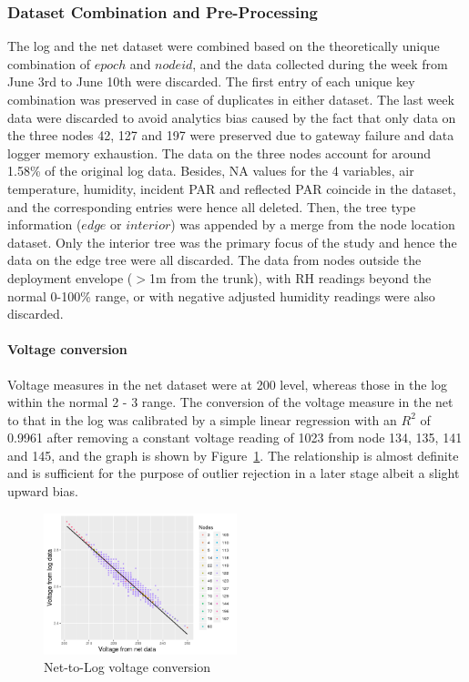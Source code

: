 \documentclass[11pt]{article}
\begin{document}
\subsubsection{Dataset Combination and Pre-Processing}
\label{subsubsec:preprocess}
The log and the net dataset were combined based on the theoretically unique combination of $epoch$ and $nodeid$, and the data collected during the week from June 3rd to June 10th were discarded. The first entry of each unique key combination was preserved in case of duplicates in either dataset. The last week data were discarded to avoid analytics bias caused by the fact that only data on the three nodes 42, 127 and 197 were preserved due to gateway failure and data logger memory exhaustion. The data on the three nodes account for around 1.58\% of the original log data. Besides, NA values for the 4 variables, air temperature, humidity, incident PAR and reflected PAR coincide in the dataset, and the corresponding entries were hence all deleted. Then, the tree type information ($edge$ or $interior$) was appended by a merge from the node location dataset. Only the interior tree was the primary focus of the study and hence the data on the edge tree were all discarded. The data from nodes outside the deployment envelope ($>$1m from the trunk), with RH readings beyond the normal 0-100\% range, or with negative adjusted humidity readings were also discarded.


\paragraph{Voltage conversion}
Voltage measures in the net dataset were at 200 level, whereas those in the log within the normal 2 - 3 range. The conversion of the voltage measure in the net to that in the log was calibrated by a simple linear regression with an $R^2$ of 0.9961 after removing a constant voltage reading of 1023 from node 134, 135, 141 and 145, and the graph is shown by Figure~\ref{fig:voltConversion}. The relationship is almost definite and is sufficient for the purpose of outlier rejection in a later stage albeit a slight upward bias.
\begin{figure}[here]
  \centering
    \includegraphics[width=0.5\textwidth]{../figures/voltConversion.png}
  \caption{Net-to-Log voltage conversion}
  \label{fig:voltConversion}
\end{figure}
\end{document}
